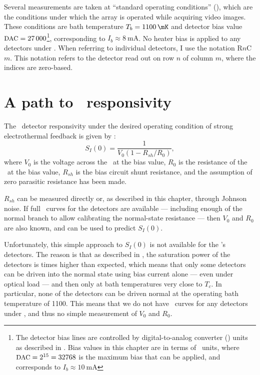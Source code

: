 Several measurements are taken at ``standard operating conditions'' (\SOC), which are the conditions under which the array is operated while acquiring video images.
These conditions are bath temperature $T_b = \SI{1100}{\mK}$ and detector bias value $\mbox{{\small DAC}} = \num{27000}$\footnote{The detector bias lines are controlled by digital-to-analog converter (\DAC) units as described in . Bias values in this chapter are in terms of \DAC\ units, where $\mbox{{\small DAC}} = 2^{15} = 32768$ is the maximum bias that can be applied, and corresponds to $I_b \approx \SI{10}{\mA}$}, corresponding to $I_b \approx \SI{8}{\mA}$.
No heater bias is applied to any detectors under \SOC.
When referring to individual detectors, I use the notation R$n$C$m$.
This notation refers to the detector read out on row $n$ of column $m$, where the indices are zero-based.

\section{A path to \DC\ responsivity}

The \DC\ detector responsivity under the desired operating condition of strong electrothermal feedback is given by :
\begin{equation} \label{eqn:ch6-si0-simple}
  S_I(0) = \frac{1}{V_0(1 - R_{sh}/R_0)},
\end{equation}
where $V_0$ is the voltage across the \TES\ at the bias value, $R_0$ is the resistance of the \TES\ at the bias value, $R_{sh}$ is the bias circuit shunt resistance, and the assumption of zero parasitic resistance has been made.

$R_{sh}$ can be measured directly or, as described in this chapter, through Johnson noise.
If full \IV\ curves for the detectors are available --- including enough of the normal branch to allow calibrating the normal-state resistance --- then $V_0$ and $R_0$ are also known, and  can be used to predict $S_I(0)$.

Unfortunately, this simple approach to $S_I(0)$ is not available for the \Imager's detectors.
The reason is that as described in , the saturation power of the detectors is  times higher than expected, which means that only some detectors can be driven into the normal state using bias current alone --- even under optical load --- and then only at bath temperatures very close to $T_c$.
In particular, none of the detectors can be driven normal at the operating bath temperature of \SI{1100}{\mK}.
This means that we do not have \IV\ curves for any detectors under \SOC, and thus no simple measurement of $V_0$ and $R_0$.

